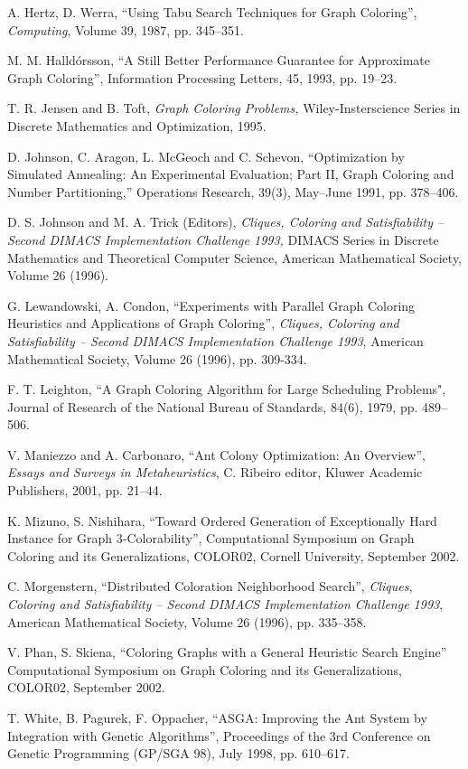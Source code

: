 \documentclass[11pt]{article}
\begin{document}
\begin{thebibliography}{99}
A. Hertz, D. Werra,
``Using Tabu Search Techniques for Graph Coloring'',
{\it Computing}, Volume 39, 1987, pp. 345--351.

M. M. Halld\'orsson,
``A Still Better Performance Guarantee for Approximate Graph Coloring'',
Information Processing Letters, 45, 1993, pp. 19--23.


T. R. Jensen and B. Toft,
{\it Graph Coloring Problems,} Wiley-Insterscience Series in Discrete
Mathematics and Optimization, 1995.


D. Johnson, C. Aragon, L. McGeoch and C. Schevon,
``Optimization by Simulated Annealing: An Experimental Evaluation; Part II,
Graph Coloring and Number Partitioning,''  
Operations Research,  39(3), May--June 1991, pp. 378--406.


D. S. Johnson and M. A. Trick (Editors),
{\it Cliques, Coloring and Satisfiability -- Second DIMACS Implementation
Challenge 1993,}  
DIMACS Series in Discrete Mathematics and Theoretical Computer Science,
American Mathematical Society, Volume 26 (1996).

G. Lewandowski, A. Condon,
``Experiments with Parallel Graph Coloring Heuristics and Applications of
Graph Coloring'',
{\it Cliques, Coloring and Satisfiability -- Second DIMACS Implementation
Challenge 1993}, American Mathematical Society, Volume 26 (1996), pp. 
309-334.

F. T. Leighton,
``A Graph Coloring Algorithm for Large Scheduling Problems",
Journal of Research of the National Bureau of Standards, 84(6), 1979, 
pp. 489--506.

V. Maniezzo and A. Carbonaro,
``Ant Colony Optimization: An Overview'', {\it Essays and Surveys in
Metaheuristics}, C. Ribeiro editor, Kluwer Academic Publishers, 2001, pp.
21--44.


K. Mizuno, S. Nishihara,
``Toward Ordered Generation of Exceptionally Hard Instance for Graph
3-Colorability'',
Computational Symposium on Graph Coloring and its Generalizations, 
COLOR02, Cornell University, September 2002.

C. Morgenstern,
``Distributed Coloration Neighborhood Search'',
{\it Cliques, Coloring and Satisfiability -- Second DIMACS Implementation
Challenge 1993}, American Mathematical Society, Volume 26 (1996), pp. 
335--358.

V. Phan, S. Skiena,
``Coloring Graphs with a General Heuristic Search Engine''
Computational Symposium on Graph Coloring and its Generalizations, 
COLOR02, September 2002.


T. White, B. Pagurek, F. Oppacher,
``ASGA: Improving the Ant System by Integration with Genetic Algorithms'',
Proceedings of the 3rd Conference on Genetic Programming (GP/SGA 98), 
July
1998, pp. 610--617.


\end{thebibliography}
\end{document}

